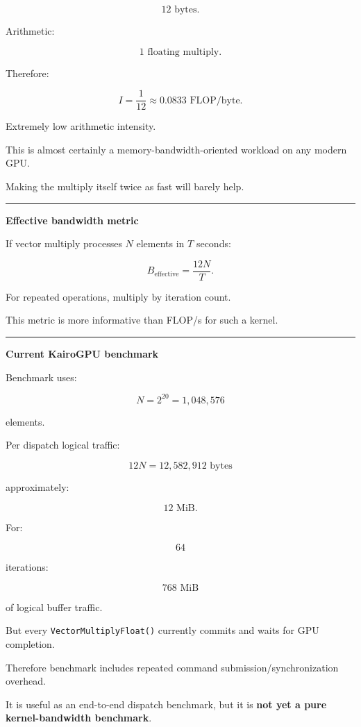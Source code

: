 \[
12\text{ bytes}.
\]

Arithmetic:

\[
1\text{ floating multiply}.
\]

Therefore:

\[
\boxed{
I=
\frac1{12}
\approx0.0833
\text{ FLOP/byte}.
}
\]

Extremely low arithmetic intensity.

This is almost certainly a memory-bandwidth-oriented workload on any modern GPU.

Making the multiply itself twice as fast will barely help.

\begin{center}\rule{0.5\linewidth}{0.5pt}\end{center}

\textbf{Effective bandwidth metric}

If vector multiply processes \(N\) elements in \(T\) seconds:

\[
\boxed{
B_{\text{effective}}
=
\frac{
12N
}{
T
}.
}
\]

For repeated operations, multiply by iteration count.

This metric is more informative than FLOP/s for such a kernel.

\begin{center}\rule{0.5\linewidth}{0.5pt}\end{center}

\textbf{Current KairoGPU benchmark}

Benchmark uses:

\[
N=2^{20}
=
1,048,576
\]

elements.

Per dispatch logical traffic:

\[
12N
=
12,582,912\text{ bytes}
\]

approximately:

\[
12\text{ MiB}.
\]

For:

\[
64
\]

iterations:

\[
768\text{ MiB}
\]

of logical buffer traffic.

But every \texttt{VectorMultiplyFloat()} currently commits and waits for GPU completion.

Therefore benchmark includes repeated command submission/synchronization overhead.

It is useful as an end-to-end dispatch benchmark, but it is \textbf{not yet a pure kernel-bandwidth benchmark}.

